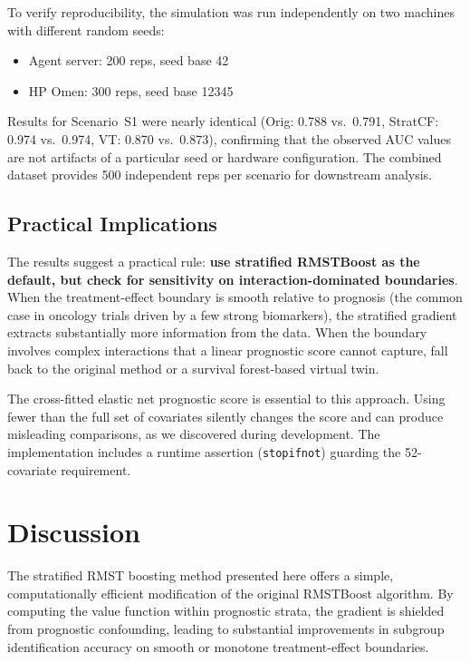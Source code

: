 \documentclass[11pt,letterpaper]{article}
\begin{document}
To verify reproducibility, the simulation was run independently on two
machines with different random seeds:
\begin{itemize}
  \item Agent server: 200 reps, seed base 42
  \item HP Omen: 300 reps, seed base 12345
\end{itemize}
Results for Scenario~S1 were nearly identical (Orig: 0.788 vs.\ 0.791,
StratCF: 0.974 vs.\ 0.974, VT: 0.870 vs.\ 0.873), confirming that the
observed AUC values are not artifacts of a particular seed or hardware
configuration.  The combined dataset provides 500 independent reps per
scenario for downstream analysis.

\subsection{Practical Implications}

The results suggest a practical rule: \textbf{use stratified RMSTBoost
as the default, but check for sensitivity on interaction-dominated
boundaries}.  When the treatment-effect boundary is smooth relative to
prognosis (the common case in oncology trials driven by a few strong
biomarkers), the stratified gradient extracts substantially more
information from the data.  When the boundary involves complex
interactions that a linear prognostic score cannot capture, fall back to
the original method or a survival forest-based virtual twin.

The cross-fitted elastic net prognostic score is essential to this
approach.  Using fewer than the full set of covariates silently changes
the score and can produce misleading comparisons, as we discovered
during development.  The implementation includes a runtime assertion
(\texttt{stopifnot}) guarding the 52-covariate requirement.

\section{Discussion}

The stratified RMST boosting method presented here offers a simple,
computationally efficient modification of the original RMSTBoost
algorithm.  By computing the value function within prognostic strata,
the gradient is shielded from prognostic confounding, leading to
substantial improvements in subgroup identification accuracy on smooth
or monotone treatment-effect boundaries.
\end{document}
